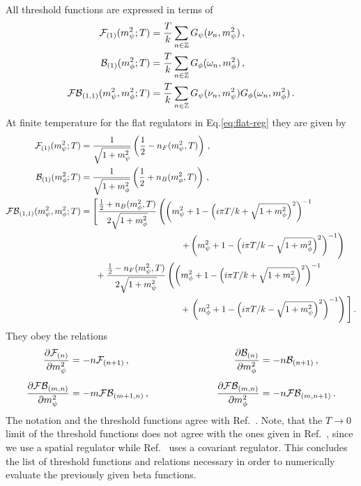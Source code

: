 \documentclass[aps,prd,11pt,tightenlines,superscriptaddress,nofootinbib,preprintnumbers,notitlepage]{revtex4-1}
\def\0#1#2{\frac{#1}{#2}}
\newcommand{\qqqquad}{\qquad \qquad \qquad}
\newcommand{\Mats}{\sum_{n\in\mathbb Z}}
\begin{document}
All threshold functions are expressed in terms of
\begin{align}
  \mathcal{F}_{(1)} (m_\psi^2;T) &= \frac{T}{k} \Mats G_\psi (\nu_n,m_\psi^2) \,,\notag \\
 \mathcal{B}_{(1)} (m_\phi^2;T) &= \frac{T}{k} \Mats G_\phi (\omega_n,m_\phi^2) \,,\notag \\
 \mathcal{FB}_{(1,1)}(m_\psi^2,m_\phi^2;T) &= \frac{T}{k} 
 \Mats G_\psi(\nu_n,m_\psi^2) G_\phi(\omega_n,m_\phi^2)  \,.
\end{align}
%
At finite temperature for the flat regulators in Eq.\eqref{eq:flat-reg} they
are given by
%
\begin{align}
 \mathcal{F}_{(1)} (m_\psi^2;T) ={}& \frac{1}{\sqrt{ 1 + m_\psi^2}} \left( \012 -  n_F ( m_\psi^2 , T ) \right)\,,\notag \\
 \mathcal{B}_{(1)} (m_\phi^2;T) ={}& \frac{1}{\sqrt{ 1 + m_\phi^2}} \left( \012 +  n_B ( m_\phi^2 , T ) \right)\,,\notag \\
 \mathcal{FB}_{(1,1)}(m_\psi^2,m_\phi^2;T) ={}& 
      \Bigg[ \frac{\frac{1}{2} + n_B(m_\phi^2 , T) }{2\sqrt{1+m_\phi^2}} 
      \left( \left(m_\psi^2 +1 - \left(i\pi T /k + \sqrt{1+m_\phi^2} \right)^2\right)^{-1}\right.\notag \\ 
      &\hspace{3.5cm}\left.+\left(m_\psi^2 +1 - 
      \left(i\pi T /k - \sqrt{1+m_\phi^2} \right)^2\right)^{-1} \right)  \notag \\
      &\,\,+\frac{ \frac{1}{2} - n_F( m_\psi^2 , T )}{2\sqrt{1+m_\psi^2}}
      \left( \left(m_\phi^2 +1 - \left(i\pi T /k + \sqrt{1+m_\psi^2} \right)^2\right)^{-1}\right.\notag \\ 
      &\hspace{3.5cm} +\left. \left(m_\phi^2 +1 - 
      \left(i\pi T /k - \sqrt{1+m_\psi^2} \right)^2\right)^{-1} \right) \Bigg]\,.
\end{align}
%
They obey the relations
%
\begin{alignat}{9} 
 \frac{\partial\mathcal{F}_{(n)} }{\partial m_\psi^2}   &= -n  \mathcal{F}_{(n+1)}\,, \qqqquad & 
 \frac{\partial\mathcal{B}_{(n)} }{\partial m_\phi^2}   &= -n  \mathcal{B}_{(n+1)} \,,\notag \\[1ex]
 \frac{\partial\mathcal{FB}_{(m,n)}}{\partial m_\psi^2}  &= -m \mathcal{FB}_{(m+1,n)}\,, \qqqquad & 
 \frac{\partial\mathcal{FB}_{(m,n)}}{\partial m_\phi^2}  &= -n \mathcal{FB}_{(m,n+1)}\,.
\end{alignat}
%
The notation and the threshold functions agree with
Ref.~\cite{Pawlowski:2014zaa}.  Note, that the $T\to0$ limit of the
threshold functions does not agree with the ones given in
Ref.~\cite{Gies:2013fua}, since we use a spatial regulator while
Ref.~\cite{Gies:2013fua} uses a covariant regulator.  This concludes
the list of threshold functions and relations necessary in order to
numerically evaluate the previously given beta functions.
\end{document}
